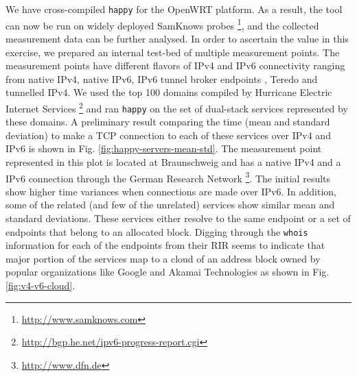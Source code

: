 We have cross-compiled \texttt{happy} for the OpenWRT \cite{fainelli:2008}
platform. As a result, the tool can now be run on widely deployed SamKnows
probes \footnote{\url{http://www.samknows.com}}, and the collected measurement
data can be further analysed. In order to ascertain the value in this
exercise, we prepared an internal test-bed of multiple measurement points. The
measurement points have different flavors of IPv4 and IPv6 connectivity
ranging from native IPv4, native IPv6, IPv6 tunnel broker endpoints
\cite{rfc3053}, Teredo \cite{rfc4380} and tunnelled IPv4. We used the top 100
domains compiled by Hurricane Electric Internet Services
\footnote{\url{http://bgp.he.net/ipv6-progress-report.cgi}} and ran
\texttt{happy} on the set of dual-stack services represented by these domains.
A preliminary result comparing the time (mean and standard deviation) to make
a TCP connection to each of these services over IPv4 and IPv6 is shown in Fig.
\ref{fig:happy-servers-mean-std}. The measurement point represented in this
plot is located at Braunschweig and has a native IPv4 and a IPv6 connection
through the German Research Network \footnote{\url{http://www.dfn.de}}. The
initial results show higher time variances when connections are made over
IPv6. In addition, some of the related (and few of the unrelated) services
show similar mean and standard deviations. These services either resolve to
the same endpoint or a set of endpoints that belong to an allocated block.
Digging through the \texttt{whois} information for each of the endpoints from
their \ac{RIR} seems to indicate that major portion of the services map to a
cloud of an address block owned by popular organizations like Google and
Akamai Technologies as shown in Fig. \ref{fig:v4-v6-cloud}.

